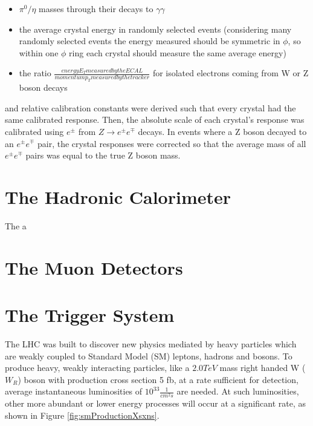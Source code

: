 \begin{itemize}
	\item $\pi^{0}/\eta$ masses through their decays to $\gamma\gamma$
	\item the average crystal energy in randomly selected events 
		(considering many randomly selected events the energy measured should be symmetric in $\phi$, so within one $\phi$ ring each crystal should measure the same average energy)
	\item the ratio $\frac{energy E_{T} measured by the ECAL}{momentum p_{T} measured by the tracker}$ for isolated electrons coming from W or Z boson decays
\end{itemize}

and relative calibration constants were derived such that every crystal had the same calibrated response.  
Then, the absolute scale of each crystal's response was calibrated using $e^{\pm}$ from 
$Z \rightarrow e^{\pm}e^{\mp}$ decays.  In events where a Z boson decayed to an $e^{\pm}e^{\mp}$ pair, the 
crystal responses were corrected so that the average mass of all $e^{\pm}e^{\mp}$ pairs was equal to 
the true Z boson mass.

\section{The Hadronic Calorimeter}
\label{sec:hcalDescription}
The a

\section{The Muon Detectors}
\label{sec:muonDetectorsDescription}

\section{The Trigger System}
\label{sec:triggerDescription}





The LHC was built to discover new physics mediated by heavy particles which are weakly coupled to Standard Model (SM)
leptons, hadrons and bosons.  To produce heavy, weakly interacting particles, like a $2.0 TeV$ mass right handed W ($W_{R}$) boson
with production cross section 5 fb, at a rate sufficient for detection, average instantaneous luminosities of
$10^{33} \frac{1}{cm^{2}s}$ are needed.  At such luminosities, other more abundant or lower energy processes will occur
at a significant rate, as shown in Figure \ref{fig:smProductionXsxns}.

